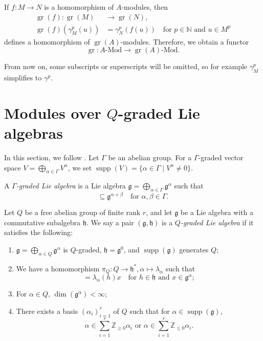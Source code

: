 \documentclass[a4paper, 12pt, reqno]{amsart}
\theoremstyle{remark}
\DeclareMathOperator{\gr}{gr}
\DeclareMathOperator{\supp}{supp}
\begin{document}
If $f: M \to N$ is a homomorphism of $A$-modules, then
\begin{align*}
  \gr(f): \gr(M) &\to \gr(N), \\
  \gr(f)(\gamma_M^p(u)) &= \gamma_N^p(f(u)) \quad \text{for $p \in \mathbb{N}$ and $u \in M^p$}
\end{align*}
defines a homomorphism of $\gr(A)$-modules.
Therefore, we obtain a functor
\begin{equation*}
  \gr: \text{$A$-Mod} \to \text{$\gr(A)$-Mod}.
\end{equation*}

From now on, some subscripts or superscripts will be omitted, so for example $\gamma^p_M$ simplifies to $\gamma^p$.

\section{Modules over $Q$-graded Lie algebras}
\label{sec:modules-over-q}

In this section, we follow \cite[\S2]{iohara_representation_2011}.
Let $\Gamma$ be an abelian group.
For a $\Gamma$-graded vector space $V = \bigoplus_{\alpha \in \Gamma}V^{\alpha}$, we set $\supp(V) = \{\alpha \in \Gamma \mid V^{\alpha} \neq 0\}$.

A \emph{$\Gamma$-graded Lie algebra} is a Lie algebra $\mathfrak{g} = \bigoplus_{\alpha \in \Gamma}\mathfrak{g}^{\alpha}$ such that
\begin{equation*}
  [\mathfrak{g}^{\alpha}, \mathfrak{g}^{\beta}] \subseteq \mathfrak{g}^{\alpha + \beta} \quad \text{for $\alpha, \beta \in \Gamma$}.
\end{equation*}

Let $Q$ be a free abelian group of finite rank $r$, and let $\mathfrak{g}$ be a Lie algebra with a commutative subalgebra $\mathfrak{h}$.
We say a pair $(\mathfrak{g}, \mathfrak{h})$ is a \emph{$Q$-graded Lie algebra} if it satisfies the following:
\begin{enumerate}
\item $\mathfrak{g} = \bigoplus_{\alpha \in Q}\mathfrak{g}^{\alpha}$ is $Q$-graded, $\mathfrak{h} = \mathfrak{g}^0$, and $\supp(\mathfrak{g})$ generates $Q$;
\item We have a homomorphism $\pi_Q: Q \to \mathfrak{h}^*, \alpha \mapsto \lambda_{\alpha}$ such that
  \begin{equation*}
    [h, x] = \lambda_{\alpha}(h)x \quad \text{for $h \in \mathfrak{h}$ and $x \in \mathfrak{g}^{\alpha}$};
  \end{equation*}
\item For $\alpha \in Q$, $\dim(\mathfrak{g}^{\alpha}) < \infty$;
\item There exists a basis $(\alpha_i)_{i = 1}^r$ of $Q$ such that for $\alpha \in \supp(\mathfrak{g})$,
  \begin{equation*}
    \text{$\alpha \in \sum_{i = 1}^r\mathbb{Z}_{\ge 0}\alpha_i$ or $\alpha \in \sum_{i = 1}^r\mathbb{Z}_{\le 0}\alpha_i$}.
  \end{equation*}
\end{enumerate}
\end{document}
